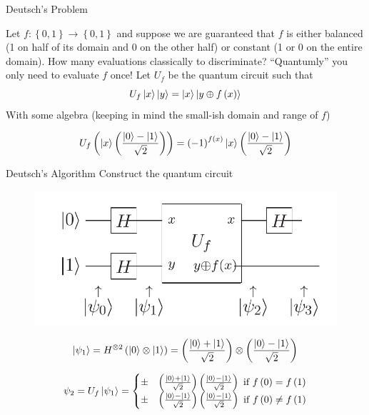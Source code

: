\documentclass{beamer}
\begin{document}
\begin{frame}{Deutsch's Problem}

Let $f:\left\{ 0,1\right\} \to\left\{ 0,1\right\}$ and suppose we are guaranteed that $f$ is either balanced (1 on half of its domain and 0 on the other half)
or constant (1 or 0 on the entire domain). How many evaluations classically to discriminate? ``Quantumly'' you only need
to evaluate $f$ once! Let $U_f$ be the quantum circuit such that 
\[
U_f\Ket{x}\Ket{y}=\Ket{x}\Ket{y\oplus f\left(x\right)}
\]
With some algebra (keeping in mind the small-ish domain and range of $f$)

\[
U_{f}\left(\Ket{x}\left(\frac{\Ket{0}-\Ket{1}}{\sqrt{2}}\right)\right)=\left(-1\right)^{f\left(x\right)}\Ket{x}\left(\frac{\Ket{0}-\Ket{1}}{\sqrt{2}}\right)
\]
\end{frame}


\begin{frame}{Deutsch's Algorithm}
Construct the quantum circuit
\begin{figure}[ht]
  \includegraphics[scale=0.33]{pasted1}
\end{figure}
\[
\Ket{\psi_{1}} = H^{\otimes2}\left(\Ket{0}\otimes\Ket{1}\right)= \left(\frac{\Ket{0}+\Ket{1}}{\sqrt{2}}\right)\otimes\left(\frac{\Ket{0}-\Ket{1}}{\sqrt{2}}\right)
\]

\[
\psi_{2}=U_{f}\Ket{\psi_{1}}=\begin{cases}
\pm & \left(\frac{\Ket{0}+\Ket{1}}{\sqrt{2}}\right)\left(\frac{\Ket{0}-\Ket{1}}{\sqrt{2}}\right)\text{ if }f\left(0\right)=f\left(1\right)\\
\pm & \left(\frac{\Ket{0}-\Ket{1}}{\sqrt{2}}\right)\left(\frac{\Ket{0}-\Ket{1}}{\sqrt{2}}\right)\text{ if }f\left(0\right)\neq f\left(1\right)
\end{cases}
\]

\end{frame}
\end{document}
